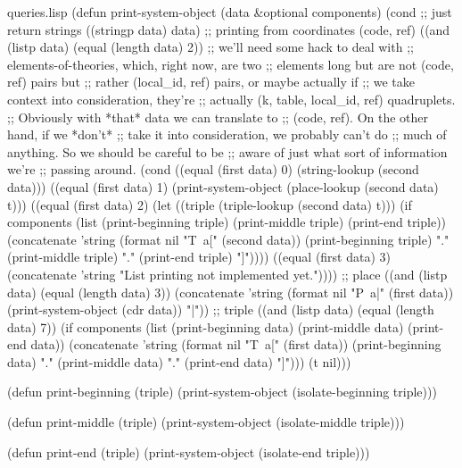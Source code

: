 \begin{common}{queries.lisp}
(defun print-system-object (data &optional components)
  (cond
    ;; just return strings
    ((stringp data)
     data)
    ;; printing from coordinates (code, ref)
    ((and (listp data)
          (equal (length data) 2))
     ;; we'll need some hack to deal with
     ;; elements-of-theories, which, right now, are two
     ;; elements long but are not (code, ref) pairs but
     ;; rather (local_id, ref) pairs, or maybe actually if
     ;; we take context into consideration, they're
     ;; actually (k, table, local_id, ref) quadruplets.
     ;; Obviously with *that* data we can translate to
     ;; (code, ref).  On the other hand, if we *don't*
     ;; take it into consideration, we probably can't do
     ;; much of anything.  So we should be careful to be
     ;; aware of just what sort of information we're
     ;; passing around.
     (cond ((equal (first data) 0)
            (string-lookup (second data)))
           ((equal (first data) 1)
            (print-system-object
             (place-lookup (second data) t)))
           ((equal (first data) 2)
            (let ((triple (triple-lookup (second data) t)))
              (if components
                  (list
                   (print-beginning triple)
                   (print-middle triple)
                   (print-end triple))
                  (concatenate
                   'string
                   (format nil "T~a[" (second data))
                   (print-beginning triple) "."
                   (print-middle triple) "."
                   (print-end triple) "]"))))
           ((equal (first data) 3)
            (concatenate 'string "List printing not implemented yet."))))
    ;; place
    ((and (listp data)
          (equal (length data) 3))
     (concatenate 'string
                  (format nil "P~a|" (first data))
                  (print-system-object (cdr data)) "|"))
    ;; triple
    ((and (listp data)
          (equal (length data) 7))
      (if components
          (list
           (print-beginning data)
           (print-middle data)
           (print-end data))
          (concatenate
           'string
           (format nil "T~a[" (first data))
           (print-beginning data) "."
           (print-middle data) "."
           (print-end data) "]")))
    (t nil)))

(defun print-beginning (triple)
  (print-system-object (isolate-beginning triple)))

(defun print-middle (triple)
  (print-system-object (isolate-middle triple)))

(defun print-end (triple)
  (print-system-object (isolate-end triple)))
\end{common}

